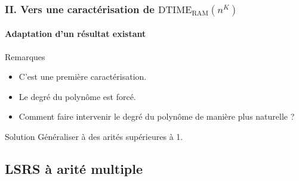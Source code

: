 \documentclass[10pt]{beamer}
\newcommand{\dtimeram}{\text{DTIME}_{\text{RAM}}\left( n^K \right)}
\begin{document}

	
	\begin{frame}
		\frametitle{II. Vers une caractérisation de $\dtimeram$}
		\framesubtitle{Adaptation d'un résultat existant}
		
		\begin{block}{Remarques}
			\begin{itemize}
				\item 	C'est une première caractérisation.
				\pause 
				\item 	Le degré du polynôme est forcé.
				\pause 
				\item 	Comment faire intervenir le degré du polynôme de manière plus naturelle ?
			\end{itemize}
		\end{block}
		
		\pause 
		
		\begin{block}{Solution}
			Généraliser à des arités supérieures à 1. 
		\end{block}
	\end{frame}
	
	
	
	
	\subsection{LSRS à arité multiple}
	
	
	
\end{document}
